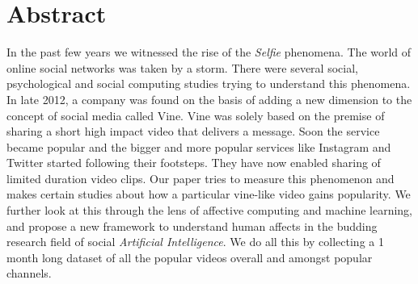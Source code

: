 \section{Abstract}
In the past few years we witnessed the rise of the \textit{Selfie} phenomena. The world of online social networks was taken by a storm. There were several social, psychological and social computing studies trying to understand this phenomena. In late 2012, a company was found on the basis of adding a new dimension to the concept of social media called Vine. Vine was solely based on the premise of sharing a short high impact video that delivers a message. Soon the service became popular and the bigger and more popular services like Instagram and Twitter started following their footsteps. They have now enabled sharing of limited duration video clips. Our paper tries to measure this phenomenon and makes certain studies about how a particular vine-like video gains popularity. We further look at this through the lens of affective computing and machine learning, and propose a new framework to understand human affects in the budding research field of social \textit{Artificial Intelligence}. We do all this by collecting a 1 month long dataset of all the popular videos overall and amongst popular channels. 
